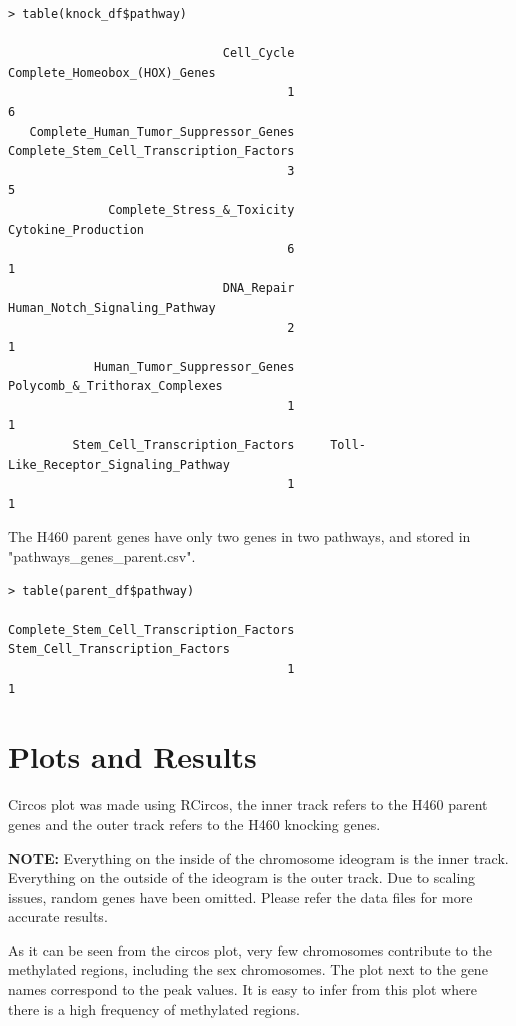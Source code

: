 \documentclass[11pt]{article}
\begin{document}
\begin{verbatim}
> table(knock_df$pathway)

                              Cell_Cycle            Complete_Homeobox_(HOX)_Genes 
                                       1                                        6 
   Complete_Human_Tumor_Suppressor_Genes Complete_Stem_Cell_Transcription_Factors 
                                       3                                        5 
              Complete_Stress_&_Toxicity                      Cytokine_Production 
                                       6                                        1 
                              DNA_Repair            Human_Notch_Signaling_Pathway 
                                       2                                        1 
            Human_Tumor_Suppressor_Genes           Polycomb_&_Trithorax_Complexes 
                                       1                                        1 
         Stem_Cell_Transcription_Factors     Toll-Like_Receptor_Signaling_Pathway 
                                       1                                        1 
\end{verbatim}



The H460 parent genes have only two genes in two pathways, and stored in "pathways\_genes\_parent.csv".

\begin{verbatim}
> table(parent_df$pathway)

Complete_Stem_Cell_Transcription_Factors          Stem_Cell_Transcription_Factors 
                                       1                                        1 
\end{verbatim}

\section*{Plots and Results}

Circos plot was made using RCircos, the inner track refers to the H460 parent genes and the outer track refers to the H460 knocking genes.

{\bf NOTE:} Everything on the inside of the chromosome ideogram is the inner track. Everything on the outside of the ideogram is the outer track. Due to scaling issues, random genes have been omitted. Please refer the data files for more accurate results.

As it can be seen from the circos plot, very few chromosomes contribute to the methylated regions, including the sex chromosomes. The plot next to the gene names correspond to the peak values. It is easy to infer from this plot where there is a high frequency of methylated regions.
\end{document}
